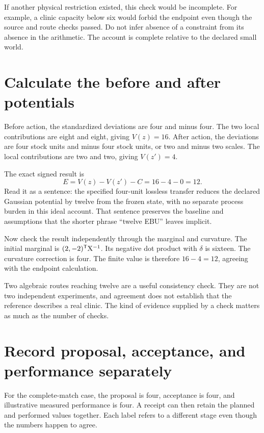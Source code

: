 If another physical restriction existed, this check would be incomplete. For example, a clinic capacity below six would forbid the endpoint even though the source and route checks passed. Do not infer absence of a constraint from its absence in the arithmetic. The account is complete relative to the declared small world.

\section{Calculate the before and after potentials}

Before action, the standardized deviations are four and minus four. The two local contributions are eight and eight, giving \(V(z)=16\). After action, the deviations are four stock units and minus four stock units, or two and minus two scales. The local contributions are two and two, giving \(V(z')=4\).

The exact signed result is
\begin{equation}
E=V(z)-V(z')-C=16-4-0=12.
\end{equation}
Read it as a sentence: the specified four-unit lossless transfer reduces the declared Gaussian potential by twelve from the frozen state, with no separate process burden in this ideal account. That sentence preserves the baseline and assumptions that the shorter phrase ``twelve EBU'' leaves implicit.

Now check the result independently through the marginal and curvature. The initial marginal is \((2,-2)^{\mathsf T}\mathrm{X}^{-1}\). Its negative dot product with \(\delta\) is sixteen. The curvature correction is four. The finite value is therefore \(16-4=12\), agreeing with the endpoint calculation.

Two algebraic routes reaching twelve are a useful consistency check. They are not two independent experiments, and agreement does not establish that the reference describes a real clinic. The kind of evidence supplied by a check matters as much as the number of checks.

\section{Record proposal, acceptance, and performance separately}

For the complete-match case, the proposal is four, acceptance is four, and illustrative measured performance is four. A receipt can then retain the planned and performed values together. Each label refers to a different stage even though the numbers happen to agree.

